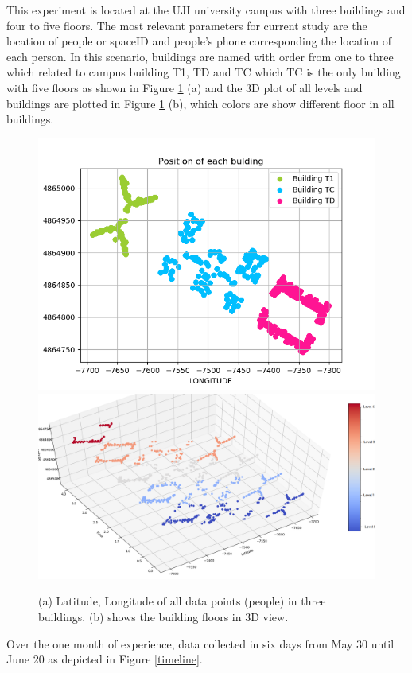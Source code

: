 This experiment is located at the UJI university campus with three buildings and four to five floors. The most relevant parameters for current study are the location of people or spaceID and people's phone corresponding the location of each person. 
In this scenario, buildings are named with order from one to three which related to campus building T1, TD and TC which TC is the only building with five floors as shown in Figure \ref{nama} (a) and the 3D plot of all levels and buildings are plotted in Figure \ref{nama} (b), which colors are show different floor in all buildings. 

\begin{figure}[!h]
    \centering
    \includegraphics[width = 7 cm]{image/Chapters/Chapter6/LatLong.png}\hfill
    \includegraphics[width = 8 cm]{image/Chapters/Chapter6/LatLongFloor.png}
    \\[\smallskipamount]    
    \caption{(a) Latitude, Longitude of all data points (people) in three buildings. (b) shows the building floors in 3D view.}
    \label{nama}
\end{figure}


Over the one month of experience, data collected in six days from May 30 until June 20 as depicted in Figure \ref{timeline}. 



